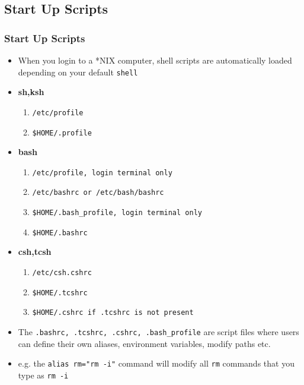 \documentclass[10pt,t]{beamer}
\begin{document}
\subsection{Start Up Scripts}
\begin{frame}
  \frametitle{Start Up Scripts}
  \begin{itemize}
    \item When you login to a *NIX computer, shell scripts are automatically loaded depending on your default \texttt{shell}
    \item \textbf{sh,ksh}
    \begin{enumerate}
        \item \texttt{/etc/profile}
        \item \texttt{\$HOME/.profile}
    \end{enumerate}
    \item \textbf{bash}
    \begin{enumerate}
        \item \texttt{/etc/profile, login terminal only}
        \item \texttt{/etc/bashrc or /etc/bash/bashrc}
        \item \texttt{\$HOME/.bash\_profile, login terminal only}
        \item \texttt{\$HOME/.bashrc}
    \end{enumerate}
    \item \textbf{csh,tcsh}
    \begin{enumerate}
        \item \texttt{/etc/csh.cshrc}
        \item \texttt{\$HOME/.tcshrc}
        \item \texttt{\$HOME/.cshrc if .tcshrc is not present}
    \end{enumerate}
    \item The \texttt{.bashrc, .tcshrc, .cshrc, .bash\_profile} are script files where users can define their own aliases, environment variables, modify paths etc.
    \item e.g. the \texttt{alias rm="rm -i"} command will modify all \texttt{rm} commands that you type as \texttt{rm -i} 
  \end{itemize}
\end{frame}
\end{document}
